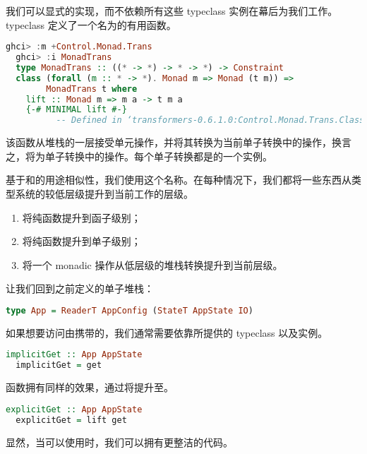 \documentclass[./main.tex]{subfiles}
\begin{document}
我们可以显式的实现，而不依赖所有这些 typeclass 实例在幕后为我们工作。 typeclass 定义了一个名为的有用函数。

\begin{lstlisting}[language=Haskell]
  ghci> :m +Control.Monad.Trans
  ghci> :i MonadTrans
  type MonadTrans :: ((* -> *) -> * -> *) -> Constraint
  class (forall (m :: * -> *). Monad m => Monad (t m)) =>
        MonadTrans t where
    lift :: Monad m => m a -> t m a
    {-# MINIMAL lift #-}
          -- Defined in ‘transformers-0.6.1.0:Control.Monad.Trans.Class’
\end{lstlisting}

该函数从堆栈的一层接受单元操作，并将其转换为当前单子转换中的操作，换言之，将为单子转换中的操作。每个单子转换都是的一个实例。

基于和的用途相似性，我们使用这个名称。在每种情况下，我们都将一些东西从类型系统的较低层级提升到当前工作的层级。

\begin{enumerate}
  \item {}将纯函数提升到函子级别；
  \item {}将纯函数提升到单子级别；
  \item {}将一个 monadic 操作从低层级的堆栈转换提升到当前层级。
\end{enumerate}

让我们回到之前定义的单子堆栈：

\begin{lstlisting}[language=Haskell]
  type App = ReaderT AppConfig (StateT AppState IO)
\end{lstlisting}

如果想要访问由携带的，我们通常需要依靠所提供的 typeclass 以及实例。

\begin{lstlisting}[language=Haskell]
  implicitGet :: App AppState
  implicitGet = get
\end{lstlisting}

函数拥有同样的效果，通过将提升至。

\begin{lstlisting}[language=Haskell]
  explicitGet :: App AppState
  explicitGet = lift get
\end{lstlisting}

显然，当可以使用时，我们可以拥有更整洁的代码。
\end{document}
